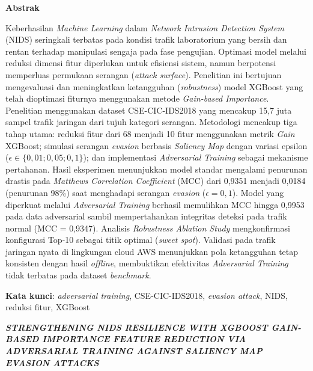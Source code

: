 \documentclass[10pt,twocolumn,a4paper]{extarticle}
\begin{document}
\begin{@twocolumnfalse}
  \begin{center}\textbf{Abstrak}\end{center}
  \noindent\small
  Keberhasilan \textit{Machine Learning} dalam \textit{Network Intrusion Detection System} (NIDS) seringkali terbatas pada kondisi trafik laboratorium yang bersih dan rentan terhadap manipulasi sengaja pada fase pengujian. Optimasi model melalui reduksi dimensi fitur diperlukan untuk efisiensi sistem, namun berpotensi memperluas permukaan serangan (\textit{attack surface}). Penelitian ini bertujuan mengevaluasi dan meningkatkan ketangguhan (\textit{robustness}) model XGBoost yang telah dioptimasi fiturnya menggunakan metode \textit{Gain-based Importance}. Penelitian menggunakan dataset CSE-CIC-IDS2018 yang mencakup 15,7 juta sampel trafik jaringan dari tujuh kategori serangan. Metodologi mencakup tiga tahap utama: reduksi fitur dari 68 menjadi 10 fitur menggunakan metrik \textit{Gain} XGBoost; simulasi serangan \textit{evasion} berbasis \textit{Saliency Map} dengan variasi epsilon ($\epsilon \in \{0{,}01; 0{,}05; 0{,}1\}$); dan implementasi \textit{Adversarial Training} sebagai mekanisme pertahanan. Hasil eksperimen menunjukkan model standar mengalami penurunan drastis pada \textit{Matthews Correlation Coefficient} (MCC) dari 0,9351 menjadi 0,0184 (penurunan 98\%) saat menghadapi serangan \textit{evasion} ($\epsilon = 0{,}1$). Model yang diperkuat melalui \textit{Adversarial Training} berhasil memulihkan MCC hingga 0,9953 pada data adversarial sambil mempertahankan integritas deteksi pada trafik normal (MCC = 0,9347). Analisis \textit{Robustness Ablation Study} mengkonfirmasi konfigurasi Top-10 sebagai titik optimal (\textit{sweet spot}). Validasi pada trafik jaringan nyata di lingkungan cloud AWS menunjukkan pola ketangguhan tetap konsisten dengan hasil \textit{offline}, membuktikan efektivitas \textit{Adversarial Training} tidak terbatas pada dataset \textit{benchmark}.

  \vspace{6pt}
  \noindent\small\textbf{Kata kunci}: \textit{adversarial training}, CSE-CIC-IDS2018, \textit{evasion attack}, NIDS, reduksi fitur, XGBoost

  \vspace{12pt}

  \begin{center}
    {\fontsize{12}{14}\selectfont \bfseries\itshape \MakeUppercase{Strengthening NIDS Resilience with XGBoost Gain-based Importance Feature Reduction via Adversarial Training against Saliency Map Evasion Attacks}\par}
    \vspace{8pt}
  \end{center}


\end{@twocolumnfalse}
\end{document}
